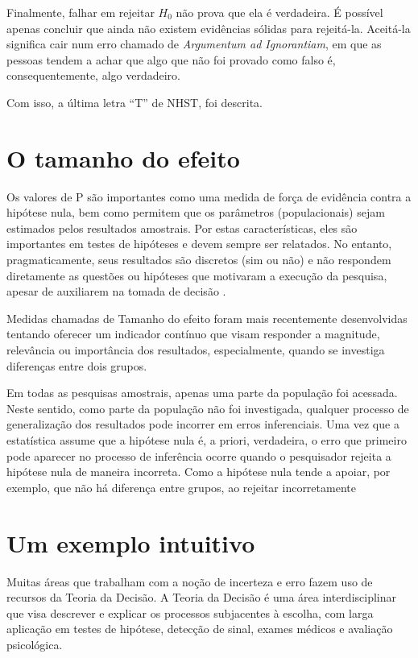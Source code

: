 \documentclass[
]{book}
\begin{document}
Finalmente, falhar em rejeitar \(H_0\) não prova que ela é verdadeira. É possível apenas concluir que ainda não existem evidências sólidas para rejeitá-la. Aceitá-la significa cair num erro chamado de \emph{Argumentum ad Ignorantiam}, em que as pessoas tendem a achar que algo que não foi provado como falso é, consequentemente, algo verdadeiro.

Com isso, a última letra ``T'' de NHST, foi descrita.

\hypertarget{o-tamanho-do-efeito}{%
\section{O tamanho do efeito}\label{o-tamanho-do-efeito}}

Os valores de P são importantes como uma medida de força de evidência contra a hipótese nula, bem como permitem que os parâmetros (populacionais) sejam estimados pelos resultados amostrais. Por estas características, eles são importantes em testes de hipóteses e devem sempre ser relatados. No entanto, pragmaticamente, seus resultados são discretos (sim ou não) e não respondem diretamente as questões ou hipóteses que motivaram a execução da pesquisa, apesar de auxiliarem na tomada de decisão \citep{Goodman1999}.

Medidas chamadas de Tamanho do efeito foram mais recentemente desenvolvidas tentando oferecer um indicador contínuo que visam responder a magnitude, relevância ou importância dos resultados, especialmente, quando se investiga diferenças entre dois grupos.

Em todas as pesquisas amostrais, apenas uma parte da população foi acessada. Neste sentido, como parte da população não foi investigada, qualquer processo de generalização dos resultados pode incorrer em erros inferenciais. Uma vez que a estatística assume que a hipótese nula é, a priori, verdadeira, o erro que primeiro pode aparecer no processo de inferência ocorre quando o pesquisador rejeita a hipótese nula de maneira incorreta. Como a hipótese nula tende a apoiar, por exemplo, que não há diferença entre grupos, ao rejeitar incorretamente

\hypertarget{um-exemplo-intuitivo}{%
\section{Um exemplo intuitivo}\label{um-exemplo-intuitivo}}

Muitas áreas que trabalham com a noção de incerteza e erro fazem uso de recursos da Teoria da Decisão. A Teoria da Decisão é uma área interdisciplinar que visa descrever e explicar os processos subjacentes à escolha, com larga aplicação em testes de hipótese, detecção de sinal, exames médicos e avaliação psicológica.
\end{document}
